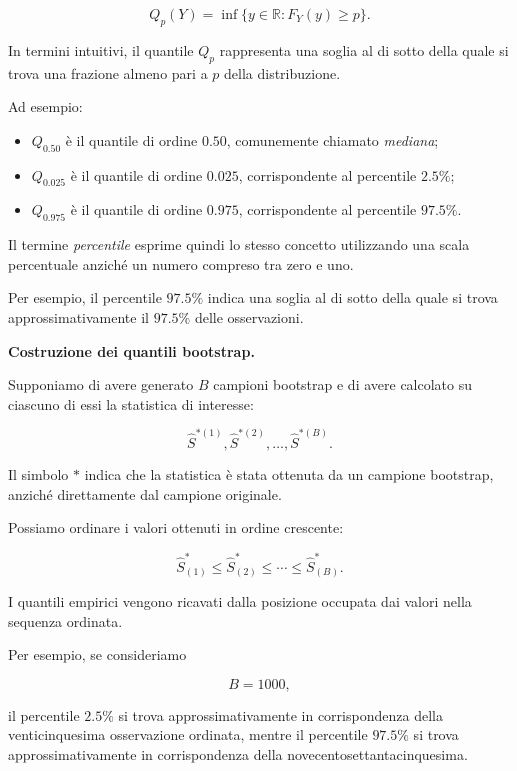 \[
\boxed{
Q_p(Y)=\inf\{y\in\mathbb{R}:F_Y(y)\geq p\}.
}
\]

In termini intuitivi, il quantile $Q_p$ rappresenta
una soglia al di sotto della quale si trova
una frazione almeno pari a $p$ della distribuzione.

Ad esempio:

\begin{itemize}
    \item $Q_{0.50}$ è il quantile di ordine $0.50$,
    comunemente chiamato \textit{mediana};

    \item $Q_{0.025}$ è il quantile di ordine $0.025$,
    corrispondente al percentile $2.5\%$;

    \item $Q_{0.975}$ è il quantile di ordine $0.975$,
    corrispondente al percentile $97.5\%$.
\end{itemize}

Il termine \textit{percentile} esprime quindi lo stesso
concetto utilizzando una scala percentuale anziché
un numero compreso tra zero e uno.

Per esempio, il percentile $97.5\%$ indica
una soglia al di sotto della quale si trova
approssimativamente il $97.5\%$ delle osservazioni.

\medskip

\noindent
\textbf{Costruzione dei quantili bootstrap.}

Supponiamo di avere generato $B$ campioni bootstrap
e di avere calcolato su ciascuno di essi la statistica
di interesse:

\[
\widehat{S}^{*(1)},
\widehat{S}^{*(2)},
\ldots,
\widehat{S}^{*(B)}.
\]

Il simbolo $*$ indica che la statistica è stata
ottenuta da un campione bootstrap, anziché
direttamente dal campione originale.

Possiamo ordinare i valori ottenuti in ordine crescente:

\[
\widehat{S}_{(1)}^*
\leq
\widehat{S}_{(2)}^*
\leq
\cdots
\leq
\widehat{S}_{(B)}^*.
\]

I quantili empirici vengono ricavati dalla posizione
occupata dai valori nella sequenza ordinata.

Per esempio, se consideriamo

\[
B=1000,
\]

il percentile $2.5\%$ si trova approssimativamente
in corrispondenza della venticinquesima osservazione
ordinata, mentre il percentile $97.5\%$ si trova
approssimativamente in corrispondenza della
novecentosettantacinquesima.

